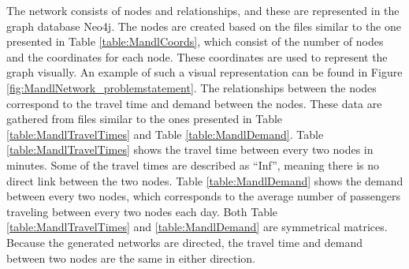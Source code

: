 The network consists of nodes and relationships, and these are represented in the graph database Neo4j. The nodes are created based on the files similar to the one presented in Table \vref{table:MandlCoords}, which consist of the number of nodes and the coordinates for each node. These coordinates are used to represent the graph visually. An example of such a visual representation can be found in Figure \vref{fig:MandlNetwork_problemstatement}. The relationships between the nodes correspond to the travel time and demand between the nodes. These data are gathered from files similar to the ones presented in Table \vref{table:MandlTravelTimes} and Table \vref{table:MandlDemand}. Table \ref{table:MandlTravelTimes} shows the travel time between every two nodes in minutes. Some of the travel times are described as ``Inf'', meaning there is no direct link between the two nodes. Table \ref{table:MandlDemand} shows the demand between every two nodes, which corresponds to the average number of passengers traveling between every two nodes each day. Both Table \ref{table:MandlTravelTimes} and \ref{table:MandlDemand} are symmetrical matrices. Because the generated networks are directed, the travel time and demand between two nodes are the same in either direction. 




